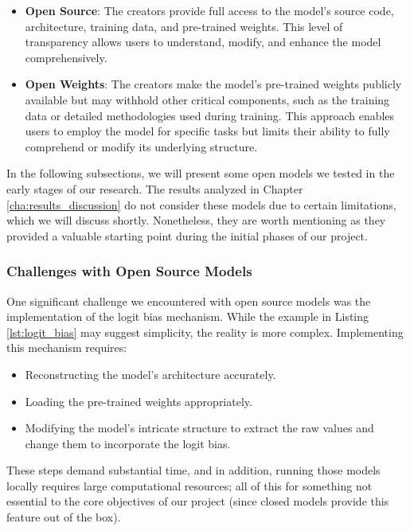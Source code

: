 \begin{itemize}
  \item \textbf{Open Source}: The creators provide full access to the model's source
    code, architecture, training data, and pre-trained weights. This level of transparency
    allows users to understand, modify, and enhance the model comprehensively.

  \item \textbf{Open Weights}: The creators make the model's pre-trained weights
    publicly available but may withhold other critical components, such as the
    training data or detailed methodologies used during training. This approach enables
    users to employ the model for specific tasks but limits their ability to fully
    comprehend or modify its underlying structure.
\end{itemize}

In the following subsections, we will present some open models we tested in the early
stages of our research. The results analyzed in Chapter
\ref{cha:results_discussion} do not consider these models due to certain
limitations, which we will discuss shortly. Nonetheless, they are worth mentioning
as they provided a valuable starting point during the initial phases of our project.

\subsubsection{Challenges with Open Source Models}

One significant challenge we encountered with open source models was the
implementation of the logit bias mechanism. While the example in Listing \ref{lst:logit_bias}
may suggest simplicity, the reality is more complex. Implementing this mechanism
requires:

\begin{itemize}
  \item Reconstructing the model's architecture accurately.

  \item Loading the pre-trained weights appropriately.

  \item Modifying the model's intricate structure to extract the raw values and change
    them to incorporate the logit bias.
\end{itemize}

These steps demand substantial time, and in addition, running those models
locally requires large computational resources; all of this for something not essential
to the core objectives of our project (since closed models provide this feature
out of the box).

